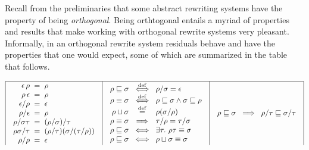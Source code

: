 
Recall from the preliminaries that some abstract rewriting systems have the property of being
\emph{orthogonal}.
Being orthtogonal entails a myriad of properties and results that make working
with orthogonal rewrite systems very pleasant.
Informally, in an orthogonal rewrite system residuals behave and have the properties
that one would expect, some of which are summarized in the table that follows.

{\footnotesize
\[
\begin{array}{|c|c|c|}
\hline
\begin{array}{r@{\hspace{0.2cm}}c@{\hspace{0.2cm}}l}
  \emptyDerivation\,\redseq & = & \redseq
\\
  \redseq\,\emptyDerivation & = & \redseq
\\
  \emptyDerivation/\redseq & = & \emptyDerivation
\\
  \redseq/\emptyDerivation & = & \redseq
\\
  \redseq/\redseqtwo\redseqthree & = & (\redseq/\redseqtwo)/\redseqthree
\\
  \redseq\redseqtwo/\redseqthree & = & (\redseq/\redseqthree)(\redseqtwo/(\redseqthree/\redseq))
\\
  \redseq/\redseq & = & \emptyDerivation
\end{array}
&
\begin{array}{r@{\hspace{0.2cm}}c@{\hspace{0.2cm}}l}
  \redseq \permle \redseqtwo & \iffdef & \redseq/\redseqtwo = \emptyDerivation
\\
  \redseq \permeq \redseqtwo & \iffdef & \redseq \permle \redseqtwo \land \redseqtwo \permle \redseq
\\
  \redseq \sqcup \redseqtwo  & \eqdef & \redseq(\redseqtwo/\redseq) 
\\
  \redseq \permeq \redseqtwo & \implies & \redseqthree/\redseq = \redseqthree/\redseqtwo
\\
  \redseq \permle \redseqtwo & \iff & \exists \redseqthree.\ \redseq\redseqthree \permeq \redseqtwo
\\
  \redseq \permle \redseqtwo & \iff & \redseq \sqcup \redseqtwo \permeq \redseqtwo
\end{array}
&
\begin{array}{r@{\hspace{0.2cm}}c@{\hspace{0.2cm}}l}
  \redseq \permle \redseqtwo & \implies & \redseq/\redseqthree \permle \redseqtwo/\redseqthree

\end{array}
\end{array}\]}
